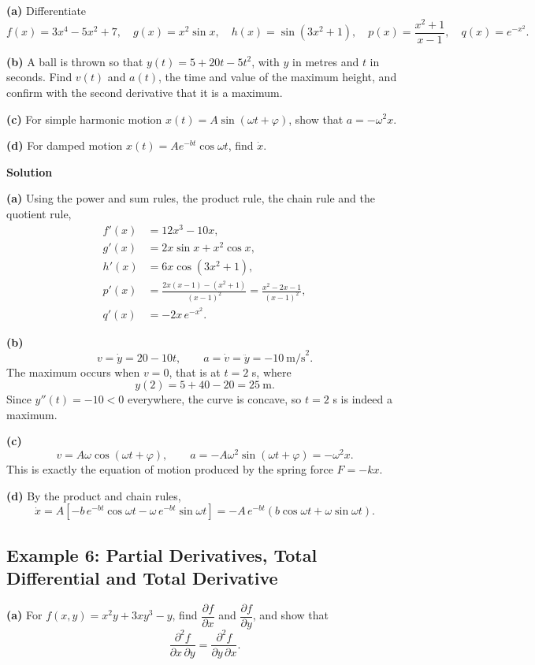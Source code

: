 \documentclass[12pt]{article}
\begin{document}
\textbf{(a)} Differentiate
\[
f(x)=3x^4-5x^2+7,
\quad
g(x)=x^2\sin x,
\quad
h(x)=\sin(3x^2+1),
\quad
p(x)=\frac{x^2+1}{x-1},
\quad
q(x)=e^{-x^2}.
\]

\textbf{(b)} A ball is thrown so that $y(t) = 5+20t-5t^2$, with $y$ in metres and $t$ in seconds. Find $v(t)$ and $a(t)$, the time and value of the maximum height, and confirm with the second derivative that it is a maximum.

\textbf{(c)} For simple harmonic motion $x(t) = A\sin(\omega t+\varphi)$, show that $a = -\omega^2 x$.

\textbf{(d)} For damped motion $x(t) = Ae^{-bt}\cos\omega t$, find $\dot{x}$.

\bigskip
\textbf{Solution}

\textbf{(a)} Using the power and sum rules, the product rule, the chain rule and the quotient rule,
\begin{align*}
f'(x) &= 12x^3-10x, \\
g'(x) &= 2x\sin x + x^2\cos x, \\
h'(x) &= 6x\cos(3x^2+1), \\
p'(x) &= \frac{2x(x-1)-(x^2+1)}{(x-1)^2} = \frac{x^2-2x-1}{(x-1)^2}, \\
q'(x) &= -2x\,e^{-x^2}.
\end{align*}

\textbf{(b)}
\[
v = \dot{y} = 20-10t,
\qquad
a = \dot{v} = \ddot{y} = -10\ \text{m/s}^2 .
\]
The maximum occurs when $v = 0$, that is at $t = 2$ s, where
\[
y(2) = 5+40-20 = 25\ \text{m}.
\]
Since $y''(t) = -10 < 0$ everywhere, the curve is concave, so $t = 2$ s is indeed a maximum.

\textbf{(c)}
\[
v = A\omega\cos(\omega t+\varphi),
\qquad
a = -A\omega^2\sin(\omega t+\varphi) = -\omega^2 x .
\]
This is exactly the equation of motion produced by the spring force $F = -kx$.

\textbf{(d)} By the product and chain rules,
\[
\dot{x} = A\left[-b\,e^{-bt}\cos\omega t - \omega\,e^{-bt}\sin\omega t\right]
= -A\,e^{-bt}\left(b\cos\omega t + \omega\sin\omega t\right).
\]


\subsection{Example 6: Partial Derivatives, Total Differential and Total Derivative}

\textbf{(a)} For $f(x,y) = x^2y+3xy^3-y$, find $\dfrac{\partial f}{\partial x}$ and $\dfrac{\partial f}{\partial y}$, and show that
\[
\frac{\partial^2 f}{\partial x\,\partial y} = \frac{\partial^2 f}{\partial y\,\partial x}.
\]
\end{document}
